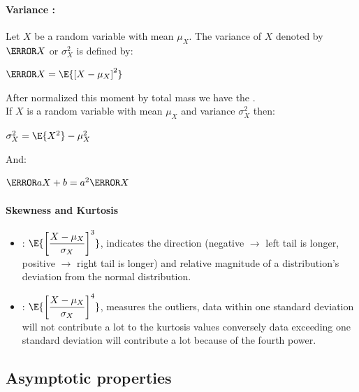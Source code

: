\paragraph{Variance :}
Let $X$ be a random variable with mean $\mu_{X}$. The variance of $X$ 
denoted by $\V{X}$ or $\sigma_{X}^{2}$ is defined by:
\begin{center}
	$\V{X}=\E{\left[ X-\mu_{X} \right]^{2}}$
\end{center}
After normalized this moment by total mass we have the .\\
If $X$ is a random variable with mean $\mu_{X}$ and variance $\sigma_{X}^{2}$ then:
\begin{center}
$\sigma_{X}^{2}=\E{X^{2}}-\mu_{X}^{2}$
\end{center}
And:
\begin{center}
	$\V{aX+b}=a^{2}\V{X}$
\end{center}

\paragraph{Skewness and Kurtosis}
\begin{itemize}
    \item {}: $\E{\left[ \dfrac{X-\mu_{X}}{\sigma_{X}} \right]^{3}}$, indicates
        the direction (negative $\rightarrow$ left tail is longer, positive $\rightarrow$ 
        right tail is longer) and relative magnitude of a distribution's deviation from
        the normal distribution.
    \item {}: $\E{\left[ \dfrac{X-\mu_{X}}{\sigma_{X}} \right]^{4}}$, measures
        the outliers, data within one standard deviation will not contribute a lot to the 
        kurtosis values conversely data exceeding one standard deviation will contribute a
        lot because of the fourth power.
\end{itemize}


\subsection{Asymptotic properties}

